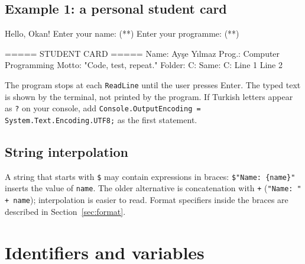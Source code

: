 \subsection{Example 1: a personal student card}

\begin{consolebox}
\begin{run}
Hello, Okan!
Enter your name: (**)
Enter your programme: (**)

===== STUDENT CARD =====
Name:   Ayşe Yılmaz
Prog.:  Computer Programming
Motto:  "Code, test, repeat."
Folder: C:
Same:   C:
Line 1
Line 2
\end{run}
\end{consolebox}
The program stops at each \texttt{ReadLine} until the user presses Enter. The typed text is shown by the terminal, not printed by the program. If Turkish letters appear as \texttt{?} on your console, add \texttt{Console.OutputEncoding = System.Text.Encoding.UTF8;} as the first statement.

\subsection{String interpolation}
A string that starts with \texttt{\$} may contain expressions in braces: \texttt{\$"Name: \{name\}"} inserts the value of \texttt{name}. The older alternative is concatenation with \texttt{+} (\texttt{"Name: " + name}); interpolation is easier to read. Format specifiers inside the braces are described in Section~\ref{sec:format}.

\section{Identifiers and variables}\label{sec:variables}

